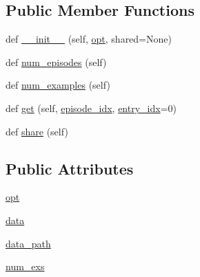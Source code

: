 \subsection*{Public Member Functions}
\begin{DoxyCompactItemize}
\item 
def \hyperlink{classparlai_1_1tasks_1_1wizard__of__wikipedia_1_1agents_1_1WizardOfWikipediaTeacher_a364b2b8db4fd8162bd72d29fe4001d90}{\+\_\+\+\_\+init\+\_\+\+\_\+} (self, \hyperlink{classparlai_1_1tasks_1_1wizard__of__wikipedia_1_1agents_1_1WizardOfWikipediaTeacher_a5d97ef38a8c6e7df29724122f5b9ff72}{opt}, shared=None)
\item 
def \hyperlink{classparlai_1_1tasks_1_1wizard__of__wikipedia_1_1agents_1_1WizardOfWikipediaTeacher_aaf24cfe4f6e58a7d9d8bda076759f76d}{num\+\_\+episodes} (self)
\item 
def \hyperlink{classparlai_1_1tasks_1_1wizard__of__wikipedia_1_1agents_1_1WizardOfWikipediaTeacher_afcede137a01b56b211aa5792346b0560}{num\+\_\+examples} (self)
\item 
def \hyperlink{classparlai_1_1tasks_1_1wizard__of__wikipedia_1_1agents_1_1WizardOfWikipediaTeacher_acf1161101f1d7d03017da25f976488d6}{get} (self, \hyperlink{classparlai_1_1core_1_1teachers_1_1FixedDialogTeacher_afd4ebab8063eb42d182d30a1a41f133e}{episode\+\_\+idx}, \hyperlink{classparlai_1_1core_1_1teachers_1_1FixedDialogTeacher_ae3201b15f3c3b46a2f3511bad9b43e7d}{entry\+\_\+idx}=0)
\item 
def \hyperlink{classparlai_1_1tasks_1_1wizard__of__wikipedia_1_1agents_1_1WizardOfWikipediaTeacher_a8b8691d7d0a5625fe8524811844109fd}{share} (self)
\end{DoxyCompactItemize}
\subsection*{Public Attributes}
\begin{DoxyCompactItemize}
\item 
\hyperlink{classparlai_1_1tasks_1_1wizard__of__wikipedia_1_1agents_1_1WizardOfWikipediaTeacher_a5d97ef38a8c6e7df29724122f5b9ff72}{opt}
\item 
\hyperlink{classparlai_1_1tasks_1_1wizard__of__wikipedia_1_1agents_1_1WizardOfWikipediaTeacher_acb5f4b5a002320ef54a635a90de99960}{data}
\item 
\hyperlink{classparlai_1_1tasks_1_1wizard__of__wikipedia_1_1agents_1_1WizardOfWikipediaTeacher_a9d14d7a5483ecef2808274cee9ec3e3c}{data\+\_\+path}
\item 
\hyperlink{classparlai_1_1tasks_1_1wizard__of__wikipedia_1_1agents_1_1WizardOfWikipediaTeacher_aebe787bd5fe4b9786187a8aecc3a3817}{num\+\_\+exs}
\end{DoxyCompactItemize}
